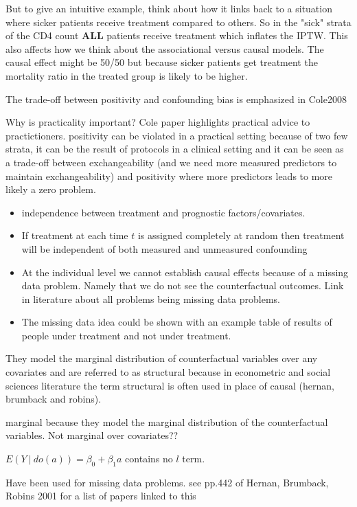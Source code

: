 \documentclass[11pt]{article}
\providecommand{\tightlist}{%
      \setlength{\itemsep}{0pt}\setlength{\parskip}{0pt}}
\begin{document}
But to give an intuitive example, think about how it links back to a
situation where sicker patients receive treatment compared to others. So
in the "sick" strata of the CD4 count \textbf{ALL} patients receive
treatment which inflates the IPTW. This also affects how we think about
the associational versus causal models. The causal effect might be 50/50
but because sicker patients get treatment the mortality ratio in the
treated group is likely to be higher.

The trade-off between positivity and confounding bias is emphasized in
Cole2008

Why is practicality important? Cole paper highlights practical advice to
practictioners. positivity can be violated in a practical setting
because of two few strata, it can be the result of protocols in a
clinical setting and it can be seen as a trade-off between
exchangeability (and we need more measured predictors to maintain
exchangeability) and positivity where more predictors leads to more
likely a zero problem.

    \begin{itemize}
\tightlist
\item
  independence between treatment and prognostic factors/covariates.
\item
  If treatment at each time \(t\) is assigned completely at random then
  treatment will be independent of both measured and unmeasured
  confounding
\item
  At the individual level we cannot establish causal effects because of
  a missing data problem. Namely that we do not see the counterfactual
  outcomes. Link in literature about all problems being missing data
  problems.
\item
  The missing data idea could be shown with an example table of results
  of people under treatment and not under treatment.
\end{itemize}

They model the marginal distribution of counterfactual variables over
any covariates and are referred to as structural because in econometric
and social sciences literature the term structural is often used in
place of causal (hernan, brumback and robins).

marginal because they model the marginal distribution of the
counterfactual variables. Not marginal over covariates??

\(E(Y\ |\ do(a)) = \beta_0 + \beta_1a\) contains no \(l\) term.

Have been used for missing data problems. see pp.442 of Hernan,
Brumback, Robins 2001 for a list of papers linked to this
\end{document}
